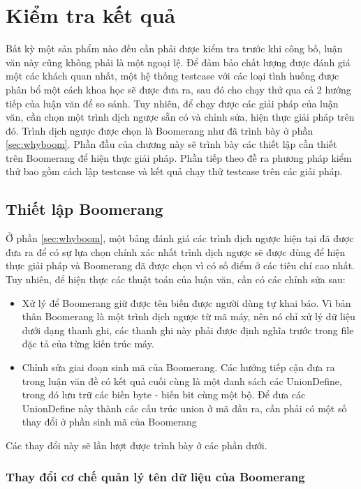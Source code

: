 \chapter{Kiểm tra kết quả}

Bất kỳ một sản phẩm nào đều cần phải được kiểm tra trước khi công bố, luận văn này cũng không phải là một ngoại lệ. Để đảm bảo chất lượng được đánh giá một các khách quan nhất, một hệ thống testcase với các loại tình huống được phân bổ một cách khoa học sẽ được đưa ra, sau đó cho chạy thử qua cả 2 hướng tiếp của luận văn để so sánh. Tuy nhiên, để chạy được các giải pháp của luận văn, cần chọn một trình dịch ngược sẵn có và chỉnh sửa, hiện thực giải pháp trên đó. Trình dịch ngược được chọn là Boomerang như đã trình bày ở phần \ref{sec:whyboom}. Phần đầu của chương này sẽ trình bày các thiết lập cần thiết trên Boomerang để hiện thực giải pháp. Phần tiếp theo đề ra phương pháp kiểm thử bao gồm cách lập testcase và kết quả chạy thử testcase trên các giải pháp.

\section{Thiết lập Boomerang}

\label{sec:boomchange}
Ở phần \ref{sec:whyboom}, một bảng đánh giá các trình dịch ngược hiện tại đã được đưa ra để có sự lựa chọn chính xác nhất trình dịch ngược sẽ được dùng để hiện thực giải pháp và Boomerang đã được chọn vì có số điểm ở các tiêu chí cao nhất. Tuy nhiên, để hiện thực các thuật toán của luận văn, cần có các chỉnh sửa sau:
\begin{itemize}
	\item Xử lý để Boomerang giữ được tên biến được người dùng tự khai báo. Vì bản thân Boomerang là một trình dịch ngược từ mã máy, nên nó chỉ xử lý dữ liệu dưới dạng thanh ghi, các thanh ghi này phải được định nghĩa trước trong file đặc tả của từng kiến trúc máy.
	\item Chỉnh sửa giai đoạn sinh mã của Boomerang. Các hướng tiếp cận đưa ra trong luận văn đề có kết quả cuối cùng là một danh sách các UnionDefine, trong đó lưu trữ các biến byte - biến bit cùng một bộ. Để đưa các UnionDefine này thành các cấu trúc union ở mã đầu ra, cần phải có một số thay đổi ở phần sinh mã của Boomerang
\end{itemize}
Các thay đổi này sẽ	 lần lượt được trình bày ở các phần dưới.

\subsection{Thay đổi cơ chế quản lý tên dữ liệu của Boomerang}

